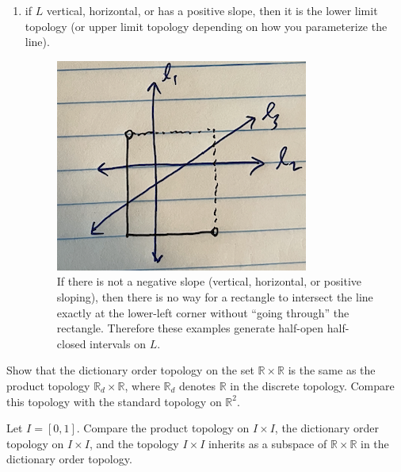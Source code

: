 \begin{solution}[Munkres 16.8]
\begin{enumerate}
      \item if $L$ vertical, horizontal, or has a positive slope, then it is the lower limit topology (or upper limit topology depending on how you parameterize the line). 

      \begin{figure}[H]
        \centering 
        \includegraphics[scale=0.4]{img/4.png}
        \caption{If there is not a negative slope (vertical, horizontal, or positive sloping), then there is no way for a rectangle to intersect the line exactly at the lower-left corner without ``going through'' the rectangle. Therefore these examples generate half-open half-closed intervals on $L$. } 
        \label{fig:4}
      \end{figure}
    \end{enumerate}
  \end{solution}

  \begin{exercise}[Munkres 16.9]
    Show that the dictionary order topology on the set $\mathbb{R} \times \mathbb{R}$ is the same as the product topology $\mathbb{R}_d \times \mathbb{R}$, where $\mathbb{R}_d$ denotes $\mathbb{R}$ in the discrete topology. Compare this topology with the standard topology on $\mathbb{R}^2$.
  \end{exercise}

  \begin{exercise}[Munkres 16.10]
    Let $I = [0, 1]$. Compare the product topology on $I \times I$, the dictionary order topology on $I \times I$, and the topology $I \times I$ inherits as a subspace of $\mathbb{R} \times \mathbb{R}$ in the dictionary order topology.
  \end{exercise}

